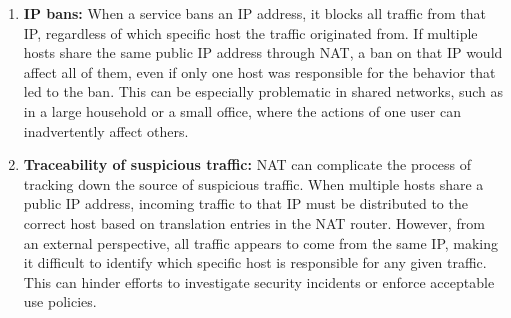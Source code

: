 \begin{enumerate}
  \item \textbf{IP bans:} When a service bans an IP address, it blocks all traffic from that IP, regardless of which specific host the traffic originated from. If multiple hosts share the same public IP address through NAT, a ban on that IP would affect all of them, even if only one host was responsible for the behavior that led to the ban. This can be especially problematic in shared networks, such as in a large household or a small office, where the actions of one user can inadvertently affect others.

  \item \textbf{Traceability of suspicious traffic:} NAT can complicate the process of tracking down the source of suspicious traffic. When multiple hosts share a public IP address, incoming traffic to that IP must be distributed to the correct host based on translation entries in the NAT router. However, from an external perspective, all traffic appears to come from the same IP, making it difficult to identify which specific host is responsible for any given traffic. This can hinder efforts to investigate security incidents or enforce acceptable use policies.
\end{enumerate}
